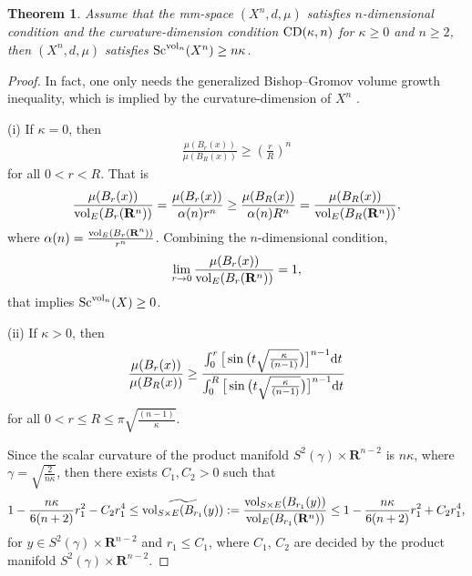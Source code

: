 \documentclass[10pt,a4paper]{amsart}
\newtheorem{Theorem}{Theorem}[section]
\begin{document}
\begin{Theorem}
Assume that the mm-space $(X^n, d, \mu)$ satisfies $n$-dimensional condition and the curvature-dimension condition ${\rm CD}(\kappa, n)$ for $\kappa\geq 0$ and $n\geq 2$, then $(X^n, d, \mu)$ satisfies ${\rm Sc}^{{\rm vol}_n}(X^n)\geq n\kappa$.
\end{Theorem}



\begin{proof}
In fact, one only needs the generalized Bishop--Gromov volume growth inequality, which is implied by the curvature-dimension of $X^n$ \cite[Theorem~2.3]{MR2237207}.

 (i) If $\kappa=0$, then
 \begin{gather*}
 \frac{\mu(B_r(x))}{\mu(B_R(x))}\geq \left(\frac{r}{R}\right)^n
 \end{gather*}
 for all $ 0< r <R$. That is
\begin{gather*}
 \frac{\mu(B_r(x))}{{\rm vol}_E(B_r(\mathbf{R}^n))} = \frac{\mu(B_r(x))}{\alpha(n)r^n}\geq \frac{\mu(B_R(x))}{\alpha(n)R^n}=\frac{\mu(B_R(x))}{{\rm vol}_E(B_R(\mathbf{R}^n))},
\end{gather*}
where $\alpha(n)=\frac{{\rm vol}_E(B_r(\mathbf{R}^n))}{r^n}$.
Combining the $n$-dimensional condition,
\begin{gather*}
 \lim\limits_{r \to 0}\frac{\mu(B_r(x))}{{\rm vol}_E(B_r(\mathbf{R}^n))}=1,
\end{gather*}
 that implies ${\rm Sc}^{{\rm vol}_n}(X)\geq 0$.

(ii) If $\kappa >0$, then
\begin{gather*}
\frac{\mu(B_r(x))}{\mu(B_R(x))}\geq \frac{\int_0^r \big[\sin\big(t\sqrt{\frac{\kappa}{(n-1)}}\big)\big]^{n-1}{\rm d}t}{\int_0^R \big[\sin\big(t\sqrt{\frac{\kappa}{(n-1)}}\big)\big]^{n-1}{\rm d}t}
\end{gather*}
 for all $ 0< r \leq R\leq \pi \sqrt{\frac{(n-1)}{\kappa}}$.

Since the scalar curvature of the product manifold $S^2(\gamma)\times \mathbf{R}^{n-2}$ is $n\kappa$, where $\gamma=\sqrt{\frac{2}{n\kappa}}$, then there exists $C_1, C_2 >0$ such that
\begin{gather*}
1 - \frac{n\kappa}{6(n+2)}r_1^2 - C_2r_1^4 \leq \widetilde{{\rm vol}_{S\times E}(B_{r_1}(y))} := \frac{ {\rm vol}_{S\times E}(B_{r_1}(y))}{{\rm vol}_E(B_{r_1}(\mathbf{R}^n))} \leq 1 - \frac{n\kappa}{6(n+2)}r_1^2 + C_2r_1^4,
\end{gather*}
 for $y\in S^2(\gamma)\times \mathbf{R}^{n-2}$ and $r_1\leq C_1$, where $C_1$, $C_2$ are decided by the product manifold $S^2(\gamma)\times \mathbf{R}^{n-2}$.


\end{proof}
\end{document}
